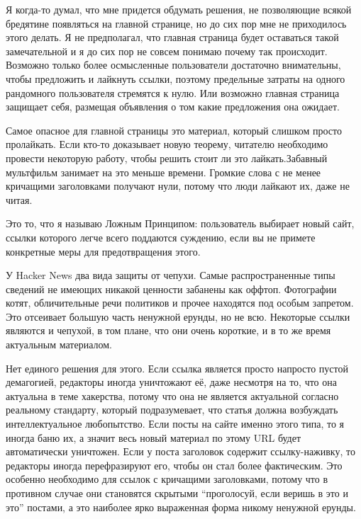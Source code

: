 \documentclass[ebook,12pt,oneside,openany]{memoir}
\begin{document}
Я когда-то думал, что мне придется обдумать решения, не позволяющие
всякой бредятине появляться на главной странице, но до сих пор мне не
приходилось этого делать. Я не предполагал, что главная страница будет
оставаться такой замечательной и я до сих пор не совсем понимаю почему
так происходит. Возможно только более осмысленные пользователи
достаточно внимательны, чтобы предложить и лайкнуть ссылки, поэтому
предельные затраты на одного рандомного пользователя стремятся к нулю.
Или возможно главная страница защищает себя, размещая объявления о том
какие предложения она ожидает. \newline

Самое опасное для главной страницы это материал, который слишком
просто пролайкать. Если кто-то доказывает новую теорему, читателю
необходимо провести некоторую работу, чтобы решить стоит ли это
лайкать.Забавный мультфильм занимает на это меньше времени. Громкие
слова с не менее кричащими заголовками получают нули, потому что люди
лайкают их, даже не читая. \newline

Это то, что я называю Ложным Принципом: пользователь выбирает новый
сайт, ссылки которого легче всего поддаются суждению, если вы не
примете конкретные меры для предотвращения этого. \newline

У Hacker News два вида защиты от чепухи. Самые распространенные типы
сведений не имеющих никакой ценности забанены как оффтоп. Фотографии
котят, обличительные речи политиков и прочее находятся под особым
запретом. Это отсеивает большую часть ненужной ерунды, но не всю.
Некоторые ссылки являются и чепухой, в том плане, что они очень
короткие, и в то же время актуальным материалом. \newline

Нет единого решения для этого. Если ссылка является просто напросто
пустой демагогией, редакторы иногда уничтожают её, даже несмотря на
то, что она актуальна в теме хакерства, потому что она не является
актуальной согласно реальному стандарту, который подразумевает, что
статья должна возбуждать интеллектуальное любопытство. Если посты на
сайте именно этого типа, то я иногда баню их, а значит весь новый
материал по этому URL будет автоматически уничтожен. Если у поста
заголовок содержит ссылку-наживку, то редакторы иногда перефразируют
его, чтобы он стал более фактическим. Это особенно необходимо для
ссылок с кричащими заголовками, потому что в противном случае они
становятся скрытыми “проголосуй, если веришь в это и это” постами, а
это наиболее ярко выраженная форма никому ненужной ерунды. \newline
\end{document}

